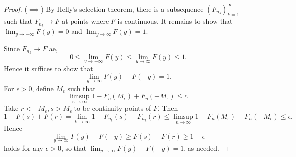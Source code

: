 \documentclass[stat901]{subfiles}
\begin{document}
    \begin{proof}
        ($\implies$) By Helly's selection theorem, there is a subsequence $\left( F_{n_k} \right)^{\infty}_{k=1}$ such that $F_{n_k}\to F$ at points where $F$ is continuous. It remains to show that $\lim_{y\to-\infty}F\left( y \right) = 0$ and $\lim_{y\to\infty}F\left( y \right)=1$.

        Since $F_{n_k}\to F$ ae,
        \begin{equation*}
            0\leq \lim_{y\to-\infty}F\left( y \right) \leq \lim_{y\to\infty} F\left( y \right) \leq 1.
        \end{equation*}
        Hence it suffices to show that
        \begin{equation*}
            \lim_{y\to\infty} F\left( y \right)-F\left( -y \right) = 1.
        \end{equation*}
        For $\epsilon>0$, define $M_{\epsilon}$ such that
        \begin{equation*}
            \limsup_{n\to\infty} 1- F_n\left( M_{\epsilon} \right) + F_n\left( -M_{\epsilon} \right) \leq \epsilon.
        \end{equation*}
        Take $r<-M_{\epsilon}, s>M_{\epsilon}$ to be continuity points of $F$. Then
        \begin{equation*}
            1-F\left( s \right)+F\left( r \right) = \lim_{k\to\infty} 1-F_{n_k}\left( s \right)+F_{n_k}\left( r \right)  \leq \limsup_{n\to\infty} 1-F_n\left( M_{\epsilon} \right) + F_n\left( -M_{\epsilon} \right) \leq \epsilon.
        \end{equation*}
        Hence
        \begin{equation*}
            \lim_{y\to\infty} F\left( y \right)-F\left( -y \right)\geq F\left( s \right)-F\left( r \right)\geq 1-\epsilon
        \end{equation*}
        holds for any $\epsilon>0$, so that $\lim_{y\to\infty}F\left( y \right)-F\left( -y \right)=1$, as needed.


\end{proof}
\end{document}
